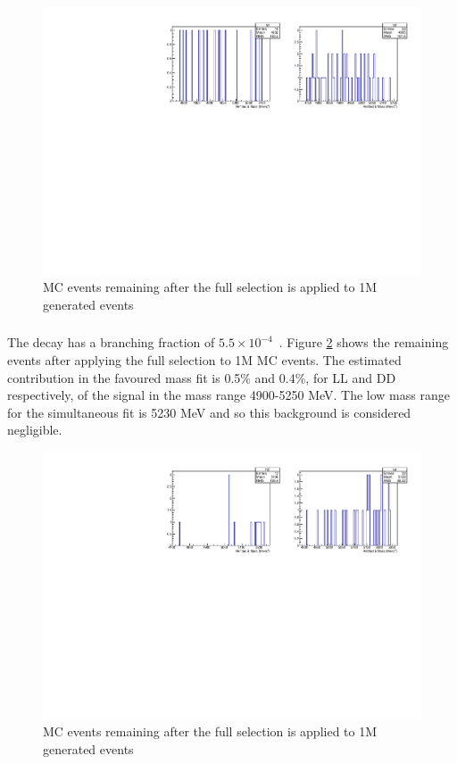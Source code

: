 \begin{figure}[h]
\centering
\includegraphics[width=0.7\linewidth]{figures/backgrounds/B2DKstPi0.pdf}
\caption{\decay{\B}{\D\Kstar\piz} MC events remaining after the full selection is applied to 1M generated events}
\label{B2DKstPi0}
\end{figure}

\subsubsection{\decay{\B}{\D\KS\kaon}}

The decay \decay{\B}{\D\KS\kaon} has a branching fraction of $5.5 \times 10^{-4}$~\cite{PDG2014}. Figure \ref{B2DKKs} shows the remaining events after applying the full selection to 1M \decay{\B}{\D\KS\kaon} MC events. The estimated contribution in the favoured \decay{\B}{\D(\kaon\pi)\Kstar} mass fit is 0.5\% and 0.4\%, for LL and DD respectively, of the signal in the mass range 4900-5250 MeV. The low mass range for the simultaneous fit is 5230 MeV and so this background is considered negligible.

\begin{figure}[h]
\centering
\includegraphics[width=0.7\linewidth]{figures/backgrounds/B2DKKs.pdf}
\caption{\decay{\B}{\D\KS\kaon} MC events remaining after the full selection is applied to 1M generated events}
\label{B2DKKs}
\end{figure}

